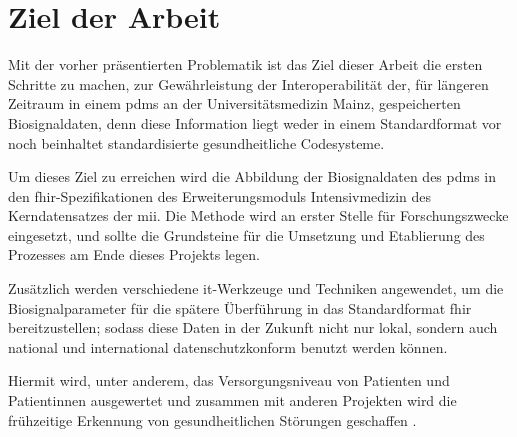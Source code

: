\section{Ziel der Arbeit} \label{sec:goal}

Mit der vorher präsentierten Problematik ist das Ziel dieser Arbeit die ersten Schritte zu machen, zur Gewährleistung der Interoperabilität der, für längeren Zeitraum in einem \ac{pdms} an der Universitätsmedizin Mainz, gespeicherten Biosignaldaten, denn diese Information liegt weder in einem Standardformat vor noch beinhaltet standardisierte gesundheitliche Codesysteme. 

Um dieses Ziel zu erreichen wird die Abbildung der Biosignaldaten des \ac{pdms} in den \ac{fhir}-Spezifikationen des Erweiterungsmoduls \glqq Intensivmedizin\grqq{} des Kerndatensatzes der \ac{mii}. Die Methode wird an erster Stelle für Forschungszwecke eingesetzt, und sollte die Grundsteine für die Umsetzung und Etablierung des Prozesses am Ende dieses Projekts legen. 

Zusätzlich werden verschiedene \ac{it}-Werkzeuge und Techniken angewendet, um die Biosignalparameter für die spätere Überführung in das Standardformat \ac{fhir} bereitzustellen; sodass diese Daten in der Zukunft nicht nur lokal, sondern auch national und international datenschutzkonform benutzt werden können. 

Hiermit wird, unter anderem, das Versorgungsniveau von Patienten und Patientinnen ausgewertet und zusammen mit anderen Projekten wird die frühzeitige Erkennung von gesundheitlichen Störungen geschaffen \cite{icukdz}.